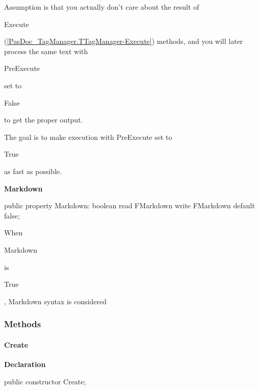 \documentclass{report}
\newif\ifpdf
\begin{document}
\begin{list}{}
\begin{itemize}
Assumption is that you actually don't care about the result of \begin{ttfamily}Execute\end{ttfamily}(\ref{PasDoc_TagManager.TTagManager-Execute}) methods, and you will later process the same text with \begin{ttfamily}PreExecute\end{ttfamily} set to \begin{ttfamily}False\end{ttfamily} to get the proper output.

The goal is to make execution with PreExecute set to \begin{ttfamily}True\end{ttfamily} as fast as possible.
\end{itemize}\label{PasDoc_TagManager.TTagManager-Markdown}
\item[\textbf{Markdown}\hfill]
\ifpdf
\begin{flushleft}
\fi
\begin{ttfamily}
public property Markdown: boolean
      read FMarkdown write FMarkdown default false;\end{ttfamily}

\ifpdf
\end{flushleft}
\fi


\par When \begin{ttfamily}Markdown\end{ttfamily} is \begin{ttfamily}True\end{ttfamily}, Markdown syntax is considered\end{list}
\subsubsection*{\large{\textbf{Methods}}\normalsize\hspace{1ex}\hfill}
\paragraph*{Create}\hspace*{\fill}

\label{PasDoc_TagManager.TTagManager-Create}
\begin{list}{}{
\setlength{\itemindent}{0cm}
\setlength{\listparindent}{0cm}
\setlength{\leftmargin}{\evensidemargin}
\addtolength{\leftmargin}{\tmplength}
\settowidth{\labelsep}{X}
\addtolength{\leftmargin}{\labelsep}
\setlength{\labelwidth}{\tmplength}
}
\item[\textbf{Declaration}\hfill]
\ifpdf
\begin{flushleft}
\fi
\begin{ttfamily}
public constructor Create;\end{ttfamily}

\ifpdf
\end{flushleft}
\fi

\end{list}
\end{document}
